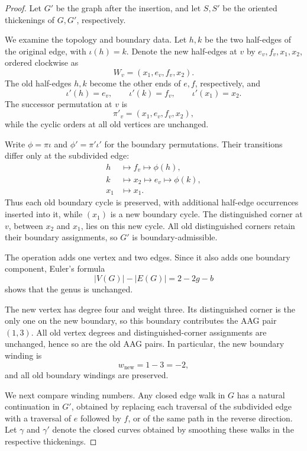 \documentclass[11pt]{amsart}
\theoremstyle{definition}
\theoremstyle{plain}
\theoremstyle{definition}
\theoremstyle{definition}
\begin{document}
\begin{proof}
Let $G'$ be the graph after the insertion, and let $S,S'$
be the oriented thickenings of $G,G'$, respectively.

We examine the topology and boundary data.
Let $h,k$ be the two half-edges of the original edge,
with $\iota(h)=k$.  Denote the new half-edges at $v$
by $e_v,f_v,x_1,x_2$, ordered clockwise as
\[
  W_v=(x_1,e_v,f_v,x_2).
\]
The old half-edges $h,k$ become the other ends of $e,f$,
respectively, and
\[
  \iota'(h)=e_v,\qquad
  \iota'(k)=f_v,\qquad
  \iota'(x_1)=x_2.
\]
The successor permutation at $v$ is
\[
  \pi'_v=(x_1,e_v,f_v,x_2),
\]
while the cyclic orders at all old vertices are unchanged.

Write $\phi=\pi\iota$ and $\phi'=\pi'\iota'$ for the
boundary permutations.  Their transitions differ only
at the subdivided edge:
\[
\begin{aligned}
  h&\longmapsto f_v\longmapsto\phi(h),\\
  k&\longmapsto x_2\longmapsto e_v
       \longmapsto\phi(k),\\
  x_1&\longmapsto x_1.
\end{aligned}
\]
Thus each old boundary cycle is preserved, with additional
half-edge occurrences inserted into it, while $(x_1)$
is a new boundary cycle.  The distinguished corner at
$v$, between $x_2$ and $x_1$, lies on this new cycle.
All old distinguished corners retain their boundary
assignments, so $G'$ is boundary-admissible.

The operation adds one vertex and two edges.  Since it
also adds one boundary component, Euler's formula
\[
  |V(G)|-|E(G)|=2-2g-b
\]
shows that the genus is unchanged.

The new vertex has degree four and weight three.
Its distinguished corner is the only one on the new
boundary, so this boundary contributes the AAG pair
$(1,3)$.  All old vertex degrees and distinguished-corner
assignments are unchanged, hence so are the old AAG
pairs.  In particular, the new boundary winding is
\[
  w_{\mathrm{new}}=1-3=-2,
\]
and all old boundary windings are preserved.

We next compare winding numbers. Any closed edge walk in
$G$ has a natural continuation in $G'$, obtained by replacing
each traversal of the subdivided edge with a traversal of
$e$ followed by $f$, or of the same path in the reverse
direction. Let $\gamma$ and $\gamma'$ denote the closed
curves obtained by smoothing these walks in the respective
thickenings.


\end{proof}
\end{document}
